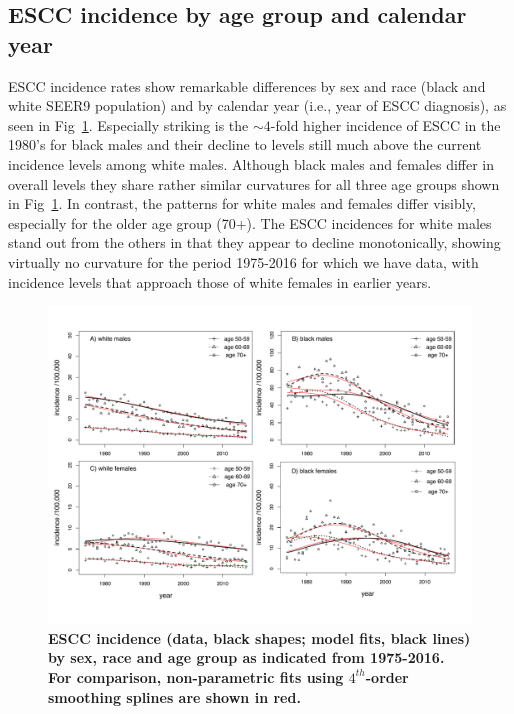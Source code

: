 \documentclass[10pt,letterpaper]{article}
\begin{document}
\subsection*{ESCC incidence by age group and calendar year}
ESCC incidence rates show remarkable differences by sex and race (black and white SEER9 population) and by calendar year (i.e., year of ESCC diagnosis), as seen in Fig~\ref{fig4}. Especially striking is the $\sim 4$-fold higher incidence of ESCC in the 1980's for black males and their decline to levels still much above the current incidence levels among white males. Although black males and females differ in overall levels they share rather similar curvatures for all three age groups shown in Fig~\ref{fig4}. In contrast, the patterns for white males and females differ visibly, especially for the older age group (70+). The ESCC incidences for white males stand out from the others in that they appear to decline monotonically, showing virtually no curvature for the period 1975-2016 for which we have data, with incidence levels that approach those of white females in earlier years.
\medskip
\begin{figure}[t]
\begin{adjustwidth}{-2.in}{0in} %
\includegraphics[scale=0.7, trim=0 20 0 50]{Fig4.pdf}
\caption{{\bf ESCC incidence (data, black shapes; model fits, black lines) by sex, race and age group as indicated from 1975-2016. For comparison, non-parametric fits using $4^{th}$-order smoothing splines are shown in red.}}
\label{fig4}
\end{adjustwidth}
\end{figure}
\end{document}
